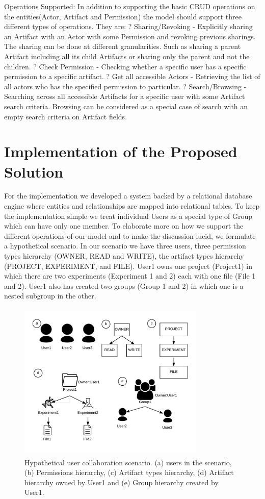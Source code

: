 \documentclass[sigconf]{acmart}
\begin{document}
Operations Supported:
	In addition to supporting the basic CRUD operations on the entities(Actor, Artifact and Permission) the model should support three different types of operations. They are:
?	Sharing/Revoking - Explicitly sharing an Artifact with an Actor with some Permission and revoking previous sharings. The sharing can be done at different granularities. Such as sharing a parent Artifact including all its child Artifacts or sharing only the parent and not the children.
?	Check Permission - Checking whether a specific user has a specific permission to a specific artifact.
?	Get all accessible Actors - Retrieving the list of all actors who has the specified permission to particular. 
?	Search/Browsing - Searching across all accessible Artifacts for a specific user with some Artifact search criteria. Browsing can be considered as a special case of search with an empty search criteria on Artifact fields.

\section{Implementation of the Proposed Solution}
For the implementation we developed a system backed by a relational database engine where entities and relationships are mapped into relational tables. To keep the implementation simple we treat individual Users as a special type of Group which can have only one member. To elaborate more on how we support the different operations of our model and to make the discussion lucid, we formulate a hypothetical scenario. In our scenario we have three users, three permission types hierarchy (OWNER, READ and WRITE), the artifact types hierarchy (PROJECT, EXPERIMENT, and FILE). User1 owns one project (Project1) in which there are two experiments (Experiment 1 and 2) each with one file (File 1 and 2). User1 also has created two groups (Group 1 and 2) in which one is a nested subgroup in the other.

\begin{figure}
\includegraphics[height=3in, width=3.5in]{figures/usage-scenarios.pdf}
\caption{Hypothetical user collaboration scenario. (a) users in the scenario, (b) Permissions hierarchy, (c) Artifact types hierarchy, (d) Artifact hierarchy owned by User1 and (e) Group hierarchy created by User1.}
\end{figure}
\end{document}
